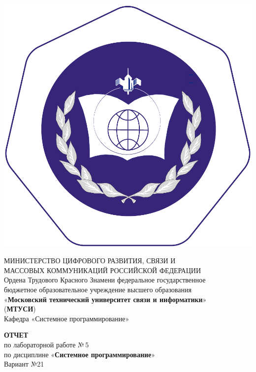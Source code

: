 \documentclass[14pt]{extarticle}
\begin{document}
{\par\centering %

\includegraphics[width=0.12\linewidth]{logo.pdf} %

МИНИСТЕРСТВО ЦИФРОВОГО РАЗВИТИЯ, СВЯЗИ И\\МАССОВЫХ КОММУНИКАЦИЙ РОССИЙСКОЙ ФЕДЕРАЦИИ\\[5mm] %

Ордена Трудового Красного Знамени федеральное государственное\\ бюджетное образовательное учреждение высшего образования\\ «\textbf{Московский технический университет связи и информатики}»\\(\textbf{МТУСИ})\\[5mm] 
	
Кафедра «Системное программирование»
\par}


\vfill\vfill %

{\par\centering
\textbf{ОТЧЕТ}\\ по лабораторной работе №\,5\\[5mm]

по дисциплине «\textbf{Системное программирование}»\\[5mm]

Вариант №21
\par}
\end{document}
